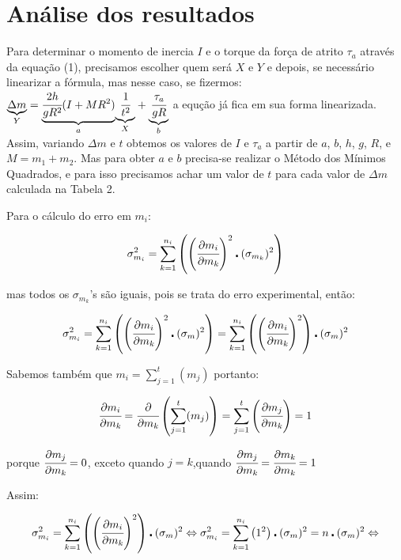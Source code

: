 \documentclass[a4paper]{article}
\begin{document}
\section{Análise dos resultados}

Para determinar o momento de inercia $I$ e o torque da força de atrito $\tau_{a}$ através da equação (1), precisamos escolher quem será $X$ e $Y$ e depois, se necessário linearizar a fórmula, mas nesse caso, se fizermos: $\underset{Y}{\underbrace{\Delta m}}=\underset{a}{\underbrace{\cfrac{2h}{gR^{2}}(I+MR^{2})}}\underset{X}{\underbrace{\ensuremath{\cfrac{1}{t^{2}}}}}+\underset{b}{\underbrace{\cfrac{\tau_{a}}{gR}}}$ a equção já fica em sua forma linearizada. Assim, variando $\Delta m$ e $t$ obtemos os valores de $I$ e $\tau_{a}$ a partir de $a$, $b$, $h$, $g$, $R$, e $M=m_{1}+m_{2}$.
Mas para obter $a$ e $b$ precisa-se realizar o Método dos Mínimos Quadrados, e para isso precisamos achar um valor de $t$ para cada valor de $\Delta m$ calculada na Tabela 2.


Para o cálculo do erro em $m_{i}$:

\begin{align}
	\sigma_{m_{i}}^{2}={\displaystyle \sum_{k=1}^{n_{i}}\left(\left(\cfrac{\partial m_{i}}{\partial m_{k}}\right)^{2}\centerdot(\sigma_{m_{k}})^{2}\right)}
\end{align}

mas todos os $\sigma_{m_{k}}$'s são iguais, pois se trata do erro experimental, então:

$$\sigma_{m_{i}}^{2}={\displaystyle \sum_{k=1}^{n_{i}}\left(\left(\cfrac{\partial m_{i}}{\partial m_{k}}\right)^{2}\centerdot(\sigma_{m})^{2}\right)}={\displaystyle \sum_{k=1}^{n_{i}}\left(\left(\cfrac{\partial m_{i}}{\partial m_{k}}\right)^{2}\right)}\centerdot(\sigma_{m})^{2}$$

Sabemos também que $m_{i}={\displaystyle \sum_{j=1}^{t}(m_{j})}$ portanto:

$$\cfrac{\partial m_{i}}{\partial m_{k}}=\cfrac{\partial}{\partial m_{k}}\left({\displaystyle \sum_{j=1}^{t}(m_{j})}\right)={\displaystyle \sum_{j=1}^{t}\left(\cfrac{\partial m_{j}}{\partial m_{k}}\right)=1}$$

porque $ \cfrac{\partial m_{j}}{\partial m_{k}}=0 $, exceto quando $j=k$,quando $\cfrac{\partial m_{j}}{\partial m_{k}}=\cfrac{\partial m_{k}}{\partial m_{k}}=1$

Assim:

$$\sigma_{m_{i}}^{2}={\displaystyle \sum_{k=1}^{n_{i}}\left(\left(\cfrac{\partial m_{i}}{\partial m_{k}}\right)^{2}\right)}\centerdot(\sigma_{m})^{2} \Leftrightarrow \sigma_{m_{i}}^{2}={\displaystyle \sum_{k=1}^{n_{i}}\left(1^{2}\right)}\centerdot(\sigma_{m})^{2}={\displaystyle n}\centerdot(\sigma_{m})^{2}\Leftrightarrow$$
\end{document}
